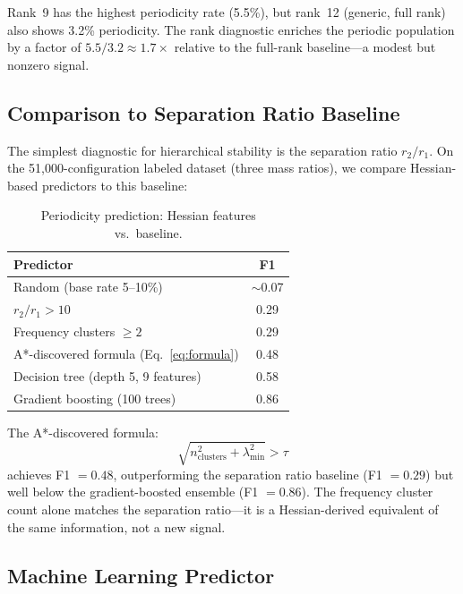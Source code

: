 \documentclass[aps,pre,twocolumn,superscriptaddress,floatfix]{revtex4-2}
\begin{document}
Rank~9 has the highest periodicity rate (5.5\%), but rank~12
(generic, full rank) also shows 3.2\% periodicity. The rank
diagnostic enriches the periodic population by a factor of
$5.5/3.2 \approx 1.7\times$ relative to the full-rank baseline---a
modest but nonzero signal.

\subsection{Comparison to Separation Ratio Baseline}

The simplest diagnostic for hierarchical stability is the separation
ratio $r_2/r_1$. On the 51{,}000-configuration labeled dataset
(three mass ratios), we compare Hessian-based predictors to this
baseline:

\begin{table}[h]
\caption{Periodicity prediction: Hessian features vs.\ baseline.}
\label{tab:comparison}
\begin{ruledtabular}
\begin{tabular}{lc}
Predictor & F1 \\
\hline
Random (base rate 5--10\%) & $\sim$0.07 \\
$r_2/r_1 > 10$ & 0.29 \\
Frequency clusters $\geq 2$ & 0.29 \\
A*-discovered formula (Eq.~\ref{eq:formula}) & 0.48 \\
Decision tree (depth 5, 9 features) & 0.58 \\
Gradient boosting (100 trees) & 0.86 \\
\end{tabular}
\end{ruledtabular}
\end{table}

The A*-discovered formula:
\begin{equation}
\sqrt{n_\mathrm{clusters}^2 + \lambda_\mathrm{min}^2} > \tau
\label{eq:formula}
\end{equation}
achieves F1 $= 0.48$, outperforming the separation ratio baseline
(F1 $= 0.29$) but well below the gradient-boosted ensemble
(F1 $= 0.86$). The frequency cluster count alone matches the
separation ratio---it is a Hessian-derived equivalent of the same
information, not a new signal.

\subsection{Machine Learning Predictor}
\end{document}
